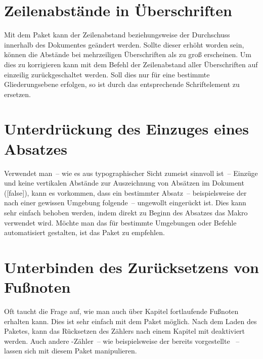 \section{Zeilenabstände in Überschriften}
\label{sec:tips:headings}
Mit dem Paket  kann der Zeilenabstand beziehungsweise der 
Durchschuss innerhalb des Dokumentes geändert werden. Sollte dieser erhöht 
worden sein, können die Abstände bei mehrzeiligen Überschriften als zu groß 
erscheinen. Um dies zu korrigieren kann mit dem Befehl %
 der 
Zeilenabstand aller Überschriften auf einzeilig zurückgeschaltet werden. Soll 
dies nur für eine bestimmte Gliederungsebene erfolgen, so ist 
 durch das entsprechende Schriftelement zu ersetzen.



\section{Unterdrückung des Einzuges eines Absatzes}
Verwendet man~-- wie es aus typographischer Sicht zumeist sinnvoll ist~-- 
Einzüge und keine vertikalen Abstände zur Auszeichnung von Absätzen im Dokument
([false]), kann es vorkommen, dass ein bestimmter Absatz~-- 
beispielsweise der nach einer gewissen Umgebung folgende~-- ungewollt 
eingerückt ist. Dies kann sehr einfach behoben werden, indem direkt zu Beginn 
des Absatzes das Makro  verwendet wird. Möchte man das für 
bestimmte Umgebungen oder Befehle automatisiert gestalten, ist das Paket
 zu empfehlen.



\section{Unterbinden des Zurücksetzens von Fußnoten}%
\label{sec:tips:counter}
Oft taucht die Frage auf, wie man auch über Kapitel fortlaufende Fußnoten 
erhalten kann. Dies ist sehr einfach mit dem Paket  möglich. 
Nach dem Laden des Paketes, kann das Rücksetzen des Zählers nach einem Kapitel 
mit  
deaktiviert werden. Auch andere -Zähler~-- wie beispielsweise der 
bereits vorgestellte ~-- lassen sich mit diesem 
Paket manipulieren.



